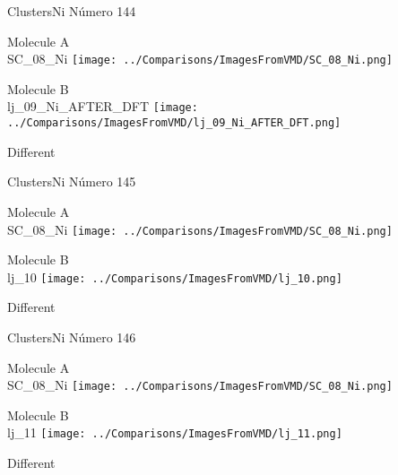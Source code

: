 \newpage

\vtab[-3cm]
\begin{center}
{\large ClustersNi \tab Número 144}
\end{center}
\begin{multicols}{2}
\begin{center}
Molecule A \\ 
SC\_08\_Ni
\texttt{[image: ../Comparisons/ImagesFromVMD/SC\_08\_Ni.png]}
\\
\vtab

\columnbreak
Molecule B \\ 
lj\_09\_Ni\_AFTER\_DFT
\texttt{[image: ../Comparisons/ImagesFromVMD/lj\_09\_Ni\_AFTER\_DFT.png]}
\\
\vtab


\end{center}
\end{multicols}
\begin{center}
\textcolor{NavyBlue}{\Large Different}
\end{center}

 \newpage

\vtab[-3cm]
\begin{center}
{\large ClustersNi \tab Número 145}
\end{center}
\begin{multicols}{2}
\begin{center}
Molecule A \\ 
SC\_08\_Ni
\texttt{[image: ../Comparisons/ImagesFromVMD/SC\_08\_Ni.png]}
\\
\vtab

\columnbreak
Molecule B \\ 
lj\_10
\texttt{[image: ../Comparisons/ImagesFromVMD/lj\_10.png]}
\\
\vtab


\end{center}
\end{multicols}
\begin{center}
\textcolor{NavyBlue}{\Large Different}
\end{center}

 \newpage

\vtab[-3cm]
\begin{center}
{\large ClustersNi \tab Número 146}
\end{center}
\begin{multicols}{2}
\begin{center}
Molecule A \\ 
SC\_08\_Ni
\texttt{[image: ../Comparisons/ImagesFromVMD/SC\_08\_Ni.png]}
\\
\vtab

\columnbreak
Molecule B \\ 
lj\_11
\texttt{[image: ../Comparisons/ImagesFromVMD/lj\_11.png]}
\\
\vtab


\end{center}
\end{multicols}
\begin{center}
\textcolor{NavyBlue}{\Large Different}
\end{center}

